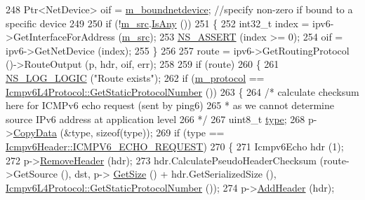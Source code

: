 \begin{DoxyCode}
248       Ptr<NetDevice> oif = \hyperlink{classns3_1_1Socket_a9781d8dfdb5e9364d5dce8f53b768bb5}{m\_boundnetdevice}; \textcolor{comment}{//specify non-zero if bound to a specific
       device}
249 
250       \textcolor{keywordflow}{if} (!\hyperlink{classns3_1_1Ipv6RawSocketImpl_a33e8cd6e8ef2da88c6a8e954f23048d0}{m\_src}.\hyperlink{classns3_1_1Ipv6Address_a6f15ff7a41a6ae2171cdeda2a53179b8}{IsAny} ())
251         \{
252           int32\_t index = ipv6->GetInterfaceForAddress (\hyperlink{classns3_1_1Ipv6RawSocketImpl_a33e8cd6e8ef2da88c6a8e954f23048d0}{m\_src});
253           \hyperlink{assert_8h_a6dccdb0de9b252f60088ce281c49d052}{NS\_ASSERT} (index >= 0);
254           oif = ipv6->GetNetDevice (index);
255         \}
256 
257       route = ipv6->GetRoutingProtocol ()->RouteOutput (p, hdr, oif, err);
258 
259       \textcolor{keywordflow}{if} (route)
260         \{
261           \hyperlink{group__logging_ga88acd260151caf2db9c0fc84997f45ce}{NS\_LOG\_LOGIC} (\textcolor{stringliteral}{"Route exists"});
262           \textcolor{keywordflow}{if} (\hyperlink{classns3_1_1Ipv6RawSocketImpl_ac745a953c5ec673bd89b170eaadab548}{m\_protocol} == \hyperlink{classns3_1_1Icmpv6L4Protocol_af845269e6c3f4509a4e287195c965afc}{Icmpv6L4Protocol::GetStaticProtocolNumber}
       ())
263             \{
264               \textcolor{comment}{/* calculate checksum here for ICMPv6 echo request (sent by ping6) }
265 \textcolor{comment}{               * as we cannot determine source IPv6 address at application level }
266 \textcolor{comment}{               */}
267               uint8\_t \hyperlink{visualizer-ideas_8txt_add98db9e15e2a58cf2b57623e7aa893a}{type};
268               p->\hyperlink{classns3_1_1Packet_a5a6d304b9e0d90733919ffe224b98f0d}{CopyData} (&type, \textcolor{keyword}{sizeof}(type));
269               \textcolor{keywordflow}{if} (type == \hyperlink{classns3_1_1Icmpv6Header_ad13fcbee075bf00f66ffbc57dfbecb70aee9d19b2f71a1cb9b076d170cfcd4231}{Icmpv6Header::ICMPV6\_ECHO\_REQUEST})
270                 \{
271                   Icmpv6Echo hdr (1);
272                   p->\hyperlink{classns3_1_1Packet_a0961eccf975d75f902d40956c93ba63e}{RemoveHeader} (hdr);
273                   hdr.CalculatePseudoHeaderChecksum (route->GetSource (), dst, p->
      \hyperlink{classns3_1_1Packet_a462855c9929954d4301a4edfe55f4f1c}{GetSize} () + hdr.GetSerializedSize (), 
      \hyperlink{classns3_1_1Icmpv6L4Protocol_af845269e6c3f4509a4e287195c965afc}{Icmpv6L4Protocol::GetStaticProtocolNumber} ());
274                   p->\hyperlink{classns3_1_1Packet_a465108c595a0bc592095cbcab1832ed8}{AddHeader} (hdr);

\end{DoxyCode}
